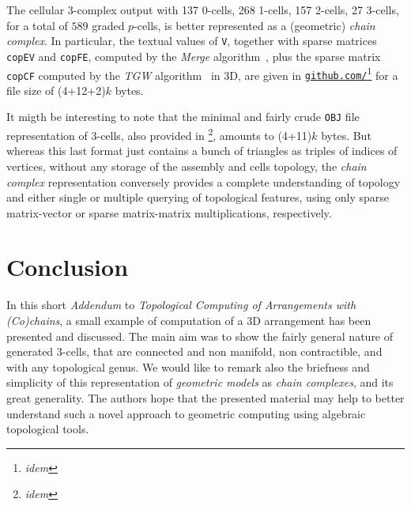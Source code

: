 \documentclass[11pt, oneside]{amsart}   	%
\begin{document}
The cellular 3-complex output with 
137 0-cells, 268 1-cells, 157 2-cells, 27 3-cells, for a total of $589$ graded $p$-cells, is better represented as a (geometric) \emph{chain complex}. In particular, 
the textual values of \texttt{V}, together with sparse matrices \texttt{copEV} and \texttt{copFE}, computed by the  \emph{Merge} algorithm~\cite{TSAS}, plus the sparse matrix \texttt{copCF} computed by the \emph{TGW} algorithm~\cite{TSAS} in 3D, are given in \texttt{\href{https://github.com/cvdlab/LinearAlgebraicRepresentation.jl}{github.com/}}\footnote{\emph{idem}}
for a file size of (4+12+2)$k$ bytes. 

It migth be interesting to note that the minimal and fairly crude \texttt{\texttt{OBJ}} file representation of 3-cells, also provided in \footnote{\emph{idem}}, amounts to (4+11)$k$ bytes.  But whereas this last format just contains a bunch of triangles as triples of indices of vertices, without any storage of the assembly and cells topology, the \emph{chain complex} representation conversely provides a complete understanding of topology and either single or multiple querying of topological features, using only sparse matrix-vector or sparse matrix-matrix  multiplications, respectively. 


\section{Conclusion}

In this short \emph{Addendum} to \emph{Topological Computing of Arrangements with (Co)chains}, a small example of computation of a 3D arrangement has been presented and discussed. The main aim was to show the fairly general nature of generated 3-cells, that are connected and non manifold, non  contractible, and with any topological genus. We would like to remark also the briefness and simplicity  of this representation of \emph{geometric models} as \emph{chain complexes}, and its great generality. 
The authors hope that the presented material may help to better understand such a novel approach to geometric computing using algebraic topological tools. 




\end{document}
